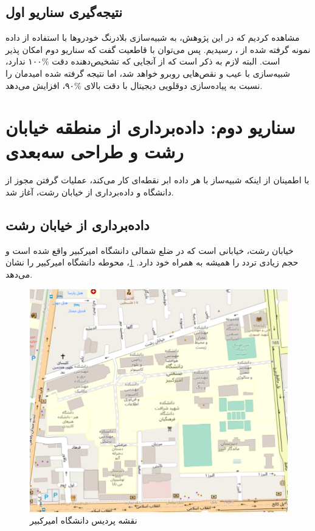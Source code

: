 \subsection{نتیجه‌گیری سناریو اول}
مشاهده کردیم که در این پژوهش، به شبیه‌سازی بلادرنگ خودروها با استفاده از داده‌ نمونه گرفته شده از ، رسیدیم. پس می‌توان با قاطعیت گفت که سناریو دوم امکان پذیر است.
البته لازم به ذکر است که از آنجایی که تشخیص‌دهنده دقت \%۱۰۰ ندارد، شبیه‌سازی با عیب‌ و نقص‌هایی روبرو خواهد شد، اما نتیجه گرفته شده امیدمان را نسبت به پیاده‌سازی دوقلویی دیجیتال با دقت بالای \%۹۰، افزایش می‌دهد.

\section{سناریو دوم: داده‌برداری از منطقه خیابان رشت و طراحی سه‌بعدی}
با اطمینان از اینکه شبیه‌ساز با هر داده ابر نقطه‌ای کار می‌کند، عملیات گرفتن مجوز از دانشگاه و داده‌برداری از خیابان رشت، آغاز شد.

\subsection{داده‌برداری از خیابان رشت}
خیابان رشت، خیابانی است که در ضلع شمالی دانشگاه امیرکبیر واقع شده است و حجم زیادی تردد را همیشه به همراه خود دارد. \cref{fig:Amirkabir_Campus}،‌  محوطه دانشگاه امیرکبیر را نشان می‌دهد.
\begin{figure}[h!]
    \centering
    \includegraphics[width=0.8\linewidth]{figures/Amirkabir_Campus.png}
    \caption{نقشه پردیس دانشگاه امیرکبیر}
    \label{fig:Amirkabir_Campus}
\end{figure}

